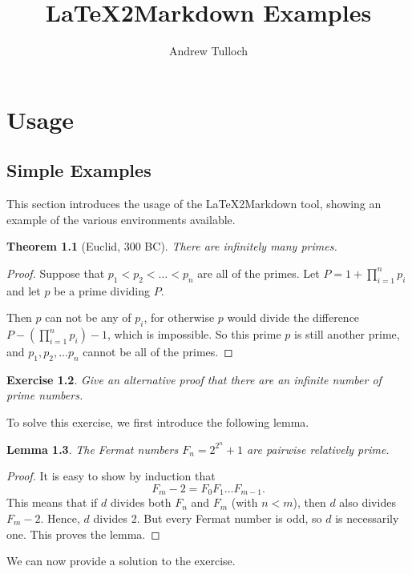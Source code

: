 \documentclass[12pt]{amsart}
\title{LaTeX2Markdown Examples}
\author{Andrew Tulloch}
\theoremstyle{plain}%
\newtheorem{thm}{Theorem}[section]
\newtheorem{lem}[thm]{Lemma}
\newtheorem{exer}[thm]{Exercise}
\begin{document}
\maketitle


\chapter{Usage}

\section{Simple Examples}

This section introduces the usage of the LaTeX2Markdown tool, showing an example of the various environments available.  

\begin{thm}[Euclid, 300 BC]
    There are infinitely many primes.
\end{thm}

\begin{proof}
    Suppose that $p_1 < p_2 < \dots < p_n$ are all of the primes. Let $P = 1 + \prod_{i=1}^n p_i$ and let $p$ be a prime dividing $P$.
    
    Then $p$ can not be any of $p_i$, for otherwise $p$ would divide the difference $P - \left(\prod_{i=1}^n p_i \right) - 1$, which is impossible. So this prime $p$ is still another prime, and $p_1, p_2, \dots p_n$ cannot be all of the primes.
\end{proof}

\begin{exer}
    Give an alternative proof that there are an infinite number of prime numbers.
\end{exer}

To solve this exercise, we first introduce the following lemma.
\begin{lem}
    The Fermat numbers $F_n = 2^{2^{n}} + 1$ are pairwise relatively prime.
\end{lem}

\begin{proof}
    It is easy to show by induction that 
    \[ F_m - 2 = F_0 F_1 \dots F_{m-1}. \]
    This means that if $d$ divides both $F_n$ and $F_m$ (with $n < m$), then $d$ also divides $F_m - 2$.  Hence, $d$ divides 2.  But every Fermat number is odd, so $d$ is necessarily one.  This proves the lemma.
\end{proof}

We can now provide a solution to the exercise.
\end{document}
